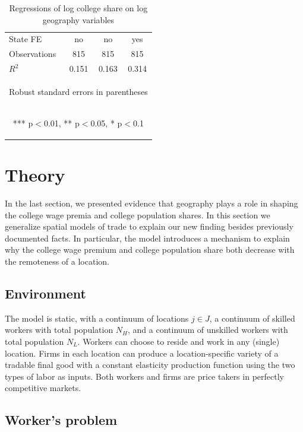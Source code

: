 \documentclass[12 pt]{article}
\begin{document}
\begin{table}[H]
\begin{tabular}{lccc}
    State FE & \mbox{no} & \mbox{no} & \mbox{yes} \\
    Observations & 815 & 815 & 815 \\
     $R^2$ & 0.151 & 0.163 & 0.314 \\ \midrule
    \multicolumn{4}{c}{\begin{footnotesize} Robust standard errors in parentheses\end{footnotesize}} \\
    \multicolumn{4}{c}{\begin{footnotesize} *** p$<$0.01, ** p$<$0.05, * p$<$0.1\end{footnotesize}} \\
    \end{tabular}
   \caption{Regressions of log college share on log geography variables}
    \label{tab:col_reg}
\end{table}

\section{Theory}
In the last section, we presented evidence that geography plays a role in shaping the college wage premia and college population shares. In this section we generalize spatial models of trade to explain our new finding besides previously documented facts. In particular, the model introduces a mechanism to explain why the college wage premium and college population share both decrease with the remoteness of a location.

\subsection{Environment}

The model is static, with a continuum of locations $j \in J$, a continuum of skilled workers with total population $N_H$, and a continuum of unskilled workers with total population $N_L$.  Workers can choose to reside and work in any (single) location.  Firms in each location can produce a location-specific variety of a tradable final good with a constant elasticity production function using the two types of labor as inputs. Both workers and firms are price takers in perfectly competitive markets.

\subsection{Worker's problem}
\end{document}
